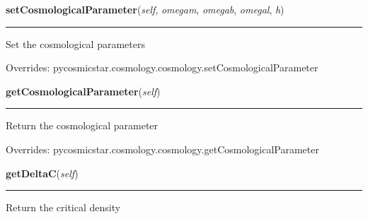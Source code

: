     \vspace{0.5ex}

\hspace{.8\funcindent}\begin{boxedminipage}{\funcwidth}

    \raggedright \textbf{setCosmologicalParameter}(\textit{self}, \textit{omegam}, \textit{omegab}, \textit{omegal}, \textit{h})

    \vspace{-1.5ex}

    \rule{\textwidth}{0.5\fboxrule}
\setlength{\parskip}{2ex}
    Set the cosmological parameters

\setlength{\parskip}{1ex}
      Overrides: pycosmicstar.cosmology.cosmology.setCosmologicalParameter

    \end{boxedminipage}

    \vspace{0.5ex}

\hspace{.8\funcindent}\begin{boxedminipage}{\funcwidth}

    \raggedright \textbf{getCosmologicalParameter}(\textit{self})

    \vspace{-1.5ex}

    \rule{\textwidth}{0.5\fboxrule}
\setlength{\parskip}{2ex}
    Return the cosmological parameter

\setlength{\parskip}{1ex}
      Overrides: pycosmicstar.cosmology.cosmology.getCosmologicalParameter

    \end{boxedminipage}

    \label{pycosmicstar:lcdmcosmology:lcdmcosmology:getDeltaC}

    \vspace{0.5ex}

\hspace{.8\funcindent}\begin{boxedminipage}{\funcwidth}

    \raggedright \textbf{getDeltaC}(\textit{self})

    \vspace{-1.5ex}

    \rule{\textwidth}{0.5\fboxrule}
\setlength{\parskip}{2ex}
    Return the critical density

\setlength{\parskip}{1ex}
    \end{boxedminipage}

